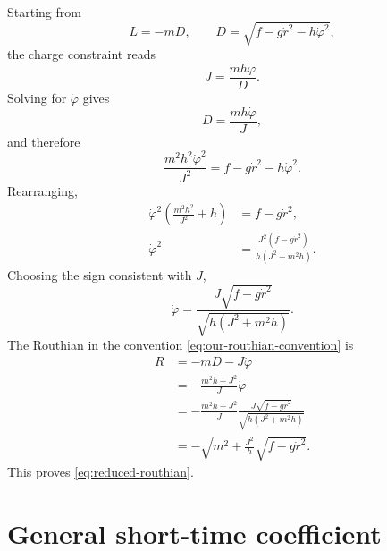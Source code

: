 \documentclass[11pt,a4paper]{article}
\theoremstyle{plain}
\theoremstyle{definition}
\theoremstyle{remark}
\begin{document}
Starting from
\begin{equation*}
L=-mD,
\qquad
D=
\sqrt{
f-g\dot r^2-h\dot\varphi^2
},
\end{equation*}
the charge constraint reads
\begin{equation*}
J=\frac{mh\dot\varphi}{D}.
\end{equation*}
Solving for $\dot\varphi$ gives
\begin{equation*}
D=\frac{mh\dot\varphi}{J},
\end{equation*}
and therefore
\begin{equation*}
\frac{m^2h^2\dot\varphi^2}{J^2}
=
f-g\dot r^2-h\dot\varphi^2.
\end{equation*}
Rearranging,
\begin{align*}
\dot\varphi^2
\left(
\frac{m^2h^2}{J^2}+h
\right)
&=
f-g\dot r^2,
\\
\dot\varphi^2
&=
\frac{
J^2(f-g\dot r^2)
}{
h(J^2+m^2h)
}.
\end{align*}
Choosing the sign consistent with $J$,
\begin{equation*}
\dot\varphi
=
\frac{
J\sqrt{f-g\dot r^2}
}{
\sqrt{h(J^2+m^2h)}
}.
\end{equation*}
The Routhian in the convention \eqref{eq:our-routhian-convention} is
\begin{align*}
R
&=
-mD-J\dot\varphi
\\
&=
-\frac{m^2h+J^2}{J}\dot\varphi
\\
&=
-\frac{m^2h+J^2}{J}
\frac{
J\sqrt{f-g\dot r^2}
}{
\sqrt{h(J^2+m^2h)}
}
\\
&=
-\sqrt{
m^2+\frac{J^2}{h}
}
\sqrt{
f-g\dot r^2
}.
\end{align*}
This proves \eqref{eq:reduced-routhian}.

\section{General short-time coefficient}
\label{app:A}
\end{document}
